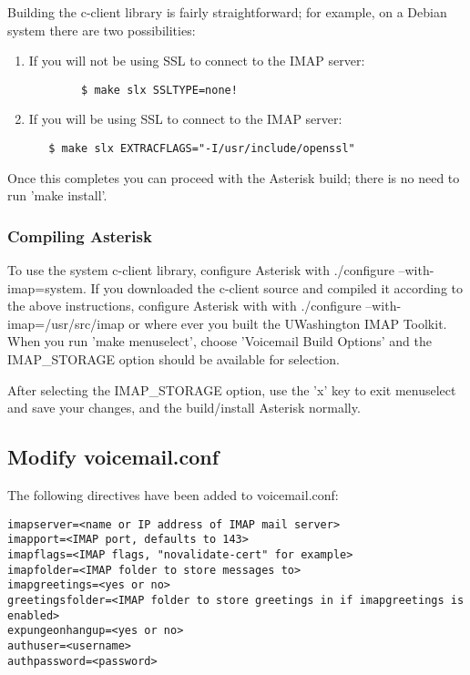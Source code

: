 Building the c-client library is fairly straightforward; for example, on a
Debian system there are two possibilities:

\begin{enumerate}
    \item If you will not be using SSL to connect to the IMAP server:
   \begin{verbatim}
        $ make slx SSLTYPE=none!
   \end{verbatim}
    \item If you will be using SSL to connect to the IMAP server:
   \begin{verbatim}
   $ make slx EXTRACFLAGS="-I/usr/include/openssl"
   \end{verbatim}
\end{enumerate}

Once this completes you can proceed with the Asterisk build; there is no
need to run 'make install'.

\subsubsection{Compiling Asterisk}

To use the system c-client library, configure Asterisk with
./configure --with-imap=system. If you downloaded the c-client source
and compiled it according to the above instructions, configure
Asterisk with with ./configure --with-imap=/usr/src/imap or where ever
you built the UWashington IMAP Toolkit. When you run 'make
menuselect', choose 'Voicemail Build Options' and the IMAP\_STORAGE
option should be available for selection.

After selecting the IMAP\_STORAGE option, use the 'x' key to exit
menuselect and save your changes, and the build/install Asterisk
normally.

\subsection{Modify voicemail.conf}

The following directives have been added to voicemail.conf:
\begin{astlisting}
\begin{verbatim}
imapserver=<name or IP address of IMAP mail server>
imapport=<IMAP port, defaults to 143>
imapflags=<IMAP flags, "novalidate-cert" for example>
imapfolder=<IMAP folder to store messages to>
imapgreetings=<yes or no>
greetingsfolder=<IMAP folder to store greetings in if imapgreetings is enabled>
expungeonhangup=<yes or no>
authuser=<username>
authpassword=<password>
\end{verbatim}
\end{astlisting}

